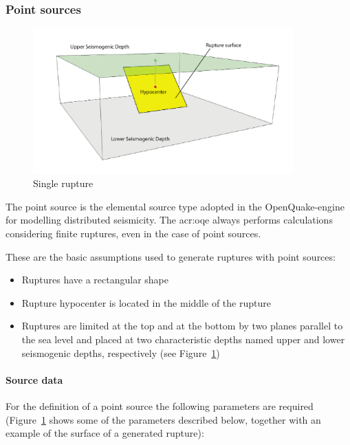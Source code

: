 \subsubsection{Point sources}
\label{subsubsec:point_sources}

\begin{figure}[!ht]
\centering
\includegraphics[width=10cm]{figures/hazard/single_rupture.pdf}
\caption{Single rupture}
\label{fig:single_rupture}
\end{figure}

The point source is the elemental source type adopted in the OpenQuake-engine
for modelling distributed seismicity. The \glsdesc{acr:oqe} always performs
calculations considering finite ruptures, even in the case of point sources.

These are the basic assumptions used to generate ruptures with point sources:

\begin{itemize}

    \item Ruptures have a rectangular shape

    \item Rupture hypocenter is located in the middle of the rupture

    \item Ruptures are limited at the top and at the bottom by two planes
    parallel to the sea level and placed at two characteristic
    depths named upper and lower seismogenic depths, respectively (see
    Figure~\ref{fig:single_rupture})

\end{itemize}

\paragraph{Source data}

For the definition of a point source the following parameters are required
(Figure~\ref{fig:single_rupture} shows some of the parameters described
below, together with an example of the surface of a generated rupture):

